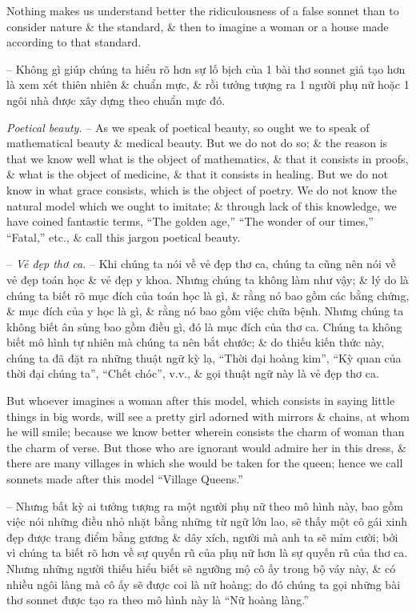 \documentclass{article}
\begin{document}
\begin{enumerate}
\begin{itemize}
		Nothing makes us understand better the ridiculousness of a false sonnet than to consider nature \& the standard, \& then to imagine a woman or a house made according to that standard.
		
		-- Không gì giúp chúng ta hiểu rõ hơn sự lố bịch của 1 bài thơ sonnet giả tạo hơn là xem xét thiên nhiên \& chuẩn mực, \& rồi tưởng tượng ra 1 người phụ nữ hoặc 1 ngôi nhà được xây dựng theo chuẩn mực đó.
		
		 {\it Poetical beauty.} -- As we speak of poetical beauty, so ought we to speak of mathematical beauty \& medical beauty. But we do not do so; \& the reason is that we know well what is the object of mathematics, \& that it consists in proofs, \& what is the object of medicine, \& that it consists in healing. But we do not know in what grace consists, which is the object of poetry. We do not know the natural model which we ought to imitate; \& through lack of this knowledge, we have coined fantastic terms, ``The golden age,'' ``The wonder of our times,'' ``Fatal,'' etc., \& call this jargon poetical beauty.
		
		-- {\it Vẻ đẹp thơ ca.} -- Khi chúng ta nói về vẻ đẹp thơ ca, chúng ta cũng nên nói về vẻ đẹp toán học \& vẻ đẹp y khoa. Nhưng chúng ta không làm như vậy; \& lý do là chúng ta biết rõ mục đích của toán học là gì, \& rằng nó bao gồm các bằng chứng, \& mục đích của y học là gì, \& rằng nó bao gồm việc chữa bệnh. Nhưng chúng ta không biết ân sủng bao gồm điều gì, đó là mục đích của thơ ca. Chúng ta không biết mô hình tự nhiên mà chúng ta nên bắt chước; \& do thiếu kiến thức này, chúng ta đã đặt ra những thuật ngữ kỳ lạ, ``Thời đại hoàng kim'', ``Kỳ quan của thời đại chúng ta'', ``Chết chóc'', v.v., \& gọi thuật ngữ này là vẻ đẹp thơ ca.
		
		But whoever imagines a woman after this model, which consists in saying little things in big words, will see a pretty girl adorned with mirrors \& chains, at whom he will smile; because we know better wherein consists the charm of woman than the charm of verse. But those who are ignorant would admire her in this dress, \& there are many villages in which she would be taken for the queen; hence we call sonnets made after this model ``Village Queens.''
		
		-- Nhưng bất kỳ ai tưởng tượng ra một người phụ nữ theo mô hình này, bao gồm việc nói những điều nhỏ nhặt bằng những từ ngữ lớn lao, sẽ thấy một cô gái xinh đẹp được trang điểm bằng gương \& dây xích, người mà anh ta sẽ mỉm cười; bởi vì chúng ta biết rõ hơn về sự quyến rũ của phụ nữ hơn là sự quyến rũ của thơ ca. Nhưng những người thiếu hiểu biết sẽ ngưỡng mộ cô ấy trong bộ váy này, \& có nhiều ngôi làng mà cô ấy sẽ được coi là nữ hoàng; do đó chúng ta gọi những bài thơ sonnet được tạo ra theo mô hình này là ``Nữ hoàng làng.''
		

\end{itemize}
\end{enumerate}
\end{document}
